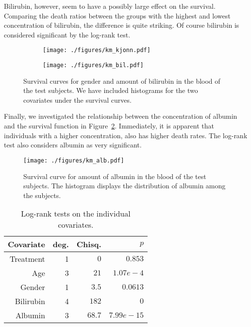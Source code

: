 \documentclass[11pt,a4paper]{article}
\begin{document}
Bilirubin, however, seem to have a possibly large effect on the survival. Comparing the death ratios between the groups with the highest and lowest concentration of bilirubin, the difference is quite striking. Of course bilirubin is considered significant by the log-rank test.
%
\begin{figure}[h!tbp]
    \centering
    \begin{subfigure}[b]{0.48\textwidth}
        \texttt{[image: ./figures/km\_kjonn.pdf]}
    \end{subfigure}%
    \quad
    \begin{subfigure}[b]{0.48\textwidth}
        \texttt{[image: ./figures/km\_bil.pdf]}
    \end{subfigure}
    \vspace{1\baselineskip}
    \caption{Survival curves for gender and amount of bilirubin in the blood of the test subjects. We have included histograms for the two covariates under the survival curves.}
    \label{fig:km_kjonn_bil}
\end{figure}

Finally, we investigated the relationship between the concentration of albumin and the survival function in Figure~\ref{fig:km_alb}. Immediately, it is apparent that individuals with a higher concentration, also has higher death rates. The log-rank test also considers albumin as very significant.

\begin{figure}[h!tb]
    \begin{center}
        \texttt{[image: ./figures/km\_alb.pdf]}
    \end{center}
    \vspace{-0.8cm}
    \caption{Survival curve for amount of albumin in the blood of the test subjects. The histogram displays the distribution of albumin among the subjects.}
    \label{fig:km_alb}
\end{figure}

\begin{table}[h!tbp]
    \centering
    \caption{Log-rank tests on the individual covariates.}
    \label{tab:log_rank_indiv}
    \begin{tabular}{rrrr}
        \hline
        Covariate & deg. & Chisq. & $p$ \\ 
        \hline
        Treatment &  1 &  $0   $ & $0.853     $ \\
        Age       &  3 &  $21  $ & $1.07e-4   $ \\ 
        Gender    &  1 &  $3.5 $ & $0.0613    $ \\ 
        Bilirubin &  4 &  $182 $ & $0         $ \\ 
        Albumin   &  3 &  $68.7$ & $7.99e-15$ \\ 
        \hline
    \end{tabular}
\end{table}
\end{document}
